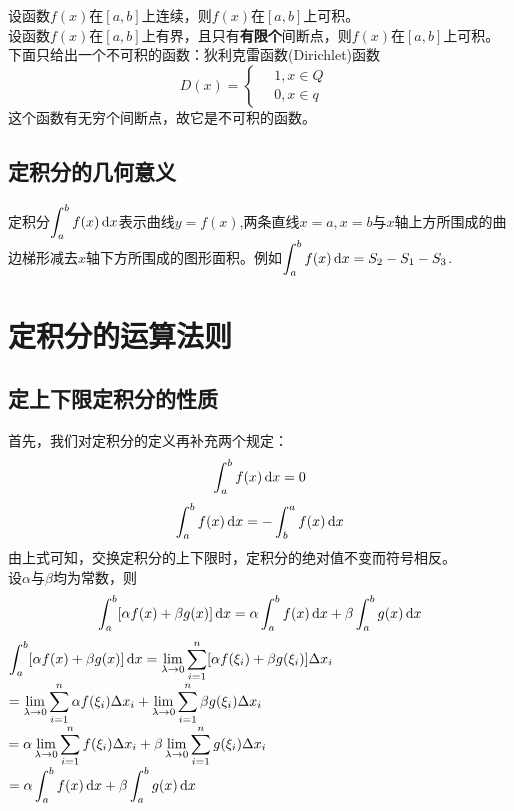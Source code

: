 \sj
\theorem[积分存在条件1]
设函数$f(x)$在$[a,b]$上连续，则$f(x)$在$[a,b]$上可积。\\

\sj
\theorem[积分存在条件2]
设函数$f(x)$在$[a,b]$上有界，且只有\textbf{有限个}间断点，则$f(x)$在$[a,b]$上可积。
下面只给出一个不可积的函数：狄利克雷函数(Dirichlet)函数
\begin{equation}
	\nonumber
	D(x)=\left\{
		\begin{aligned}
			& \,1,x\in Q\\
			& \,0,x\in q&
		\end{aligned}
		\right.
\end{equation}
这个函数有无穷个间断点，故它是不可积的函数。
\subsection{定积分的几何意义}
定积分$\displaystyle\int_{a}^{b}f(x) \,{\rm{d}} x$表示曲线$y=f(x)$,两条直线$x=a,x=b$与$x$轴上方所围成的曲边梯形减去$x$轴下方所围成的图形面积。例如$\displaystyle\int_{a}^{b}f(x) \,{\rm{d}} x=S_2-S_1-S_3$.
\section{定积分的运算法则}
\subsection{定上下限定积分的性质}
首先，我们对定积分的定义再补充两个规定：
\begin{equation}
	\int_{a}^{b}f(x) \,{\rm{d}} x=0
\end{equation}
\begin{equation}
	\int_{a}^{b}f(x) \,{\rm{d}} x=-\int_{b}^{a}f(x) \,{\rm{d}} x
\end{equation}
由上式可知，交换定积分的上下限时，定积分的绝对值不变而符号相反。\\

\sj
\theorem[定上下限积分性质1]
设$\alpha$与$\beta$均为常数，则
\begin{equation}
	\int_{a}^{b}[\alpha f(x)+\beta g(x)] \,{\rm{d}} x=\alpha\int_{a}^{b}f(x) \,{\rm{d}} x+\beta\int_{a}^{b}g(x) \,{\rm{d}} x
\end{equation}
\proof $\displaystyle\int_{a}^{b}[\alpha f(x)+\beta g(x)] \,{\rm{d}} x=\lim\limits_{\lambda\to0}\sum_{i=1}^{n}[\alpha f(\xi_i)+\beta g(\xi_i)]\Delta x_i$\vspace{-1em}\\
\hspace*{14.7em}$=\displaystyle\lim\limits_{\lambda\to0}\sum_{i=1}^{n}\alpha f(\xi_i)\Delta x_i+\lim\limits_{\lambda\to0}\sum_{i=1}^{n}\beta g(\xi_i)\Delta x_i$\\
\hspace*{14.7em}$=\displaystyle\alpha\lim\limits_{\lambda\to0}\sum_{i=1}^{n}f(\xi_i)\Delta x_i+\beta\lim\limits_{\lambda\to0}\sum_{i=1}^{n}g(\xi_i)\Delta x_i$\\
\hspace*{14.7em}$=\alpha \displaystyle\int_{a}^{b}f(x)\,{\rm{d}} x+\beta \int_{a}^{b}g(x)\,{\rm{d}} x$\\

